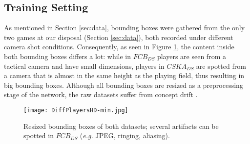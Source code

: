 \documentclass{article}
\newcommand{\cb}[2]{{\sout{#1}}{\color{cyan}#2}}
\begin{document}
\subsection{Training Setting}
As mentioned in Section \ref{sec:data}, bounding boxes were gathered from the only two games at our disposal (Section \ref{sec:data}), both recorded under different camera shot conditions. %
Consequently, as seen in Figure \ref{fig:diffPl}, the content inside both bounding boxes differs a lot: while in $FCB_{DS}$ players are seen from a tactical camera and have small dimensions, players in $CSKA_{DS}$ are spotted from a camera that is almost in the same height as the playing field, thus resulting in big bounding boxes. Although all bounding boxes are resized as a preprocessing stage of the network, the raw datasets suffer from concept drift \cite{webb2016characterizing}.
\begin{figure}
\begin{center}
  \texttt{[image: DiffPlayersHD-min.jpg]}
    \caption{Resized bounding boxes of both datasets; several artifacts can be spotted in $FCB_{DS}$ (\textit{e.g.} JPEG, ringing, aliasing).}
  \label{fig:diffPl}
 \end{center}
\end{figure}
\end{document}

